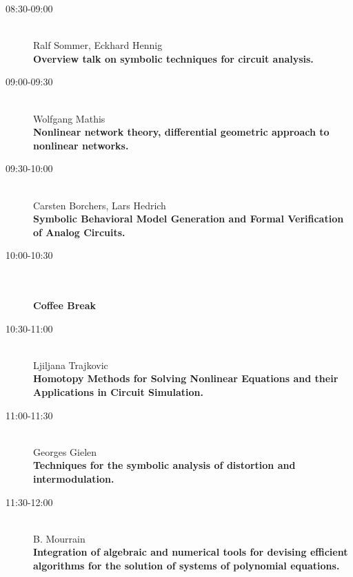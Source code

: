 \begin{description}
\item[08:30-09:00] \ \\
  Ralf Sommer, Eckhard Hennig\\
  {\bf Overview talk on symbolic techniques for circuit analysis.} 
\item[09:00-09:30] \ \\
  Wolfgang Mathis\\
  {\bf Nonlinear network theory, differential geometric approach to nonlinear networks.} 
\item[09:30-10:00] \ \\
  Carsten Borchers, Lars Hedrich\\
  {\bf Symbolic Behavioral Model Generation and Formal Verification of Analog Circuits.
 } 
\item[10:00-10:30] \ \\
  \\
  {\bf Coffee Break } 
\item[10:30-11:00] \ \\
  Ljiljana Trajkovic\\
  {\bf Homotopy Methods for Solving Nonlinear Equations and their Applications in Circuit
    Simulation.
} 
\item[11:00-11:30] \ \\
  Georges Gielen
\\
  {\bf Techniques for the symbolic analysis of distortion and intermodulation.
} 
\item[11:30-12:00] \ \\
  B. Mourrain\\
  {\bf Integration of algebraic and numerical tools for devising efficient algorithms for the
    solution of systems of polynomial equations.} 
\end{description}

